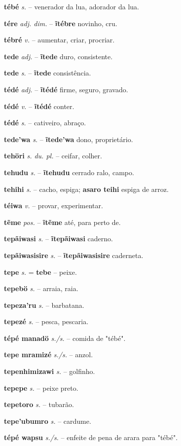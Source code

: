 \textbf{tébé} \textit{s.} -- venerador da lua, adorador da lua.

\textbf{tére} \textit{adj. dim.} -- \textbf{ĩtébre} novinho, cru.

\textbf{tébré} \textit{v.} -- aumentar, criar, procriar.

\textbf{tede} \textit{adj.} -- \textbf{ĩtede} duro, consistente.

\textbf{tede} \textit{s.} -- \textbf{ĩtede} consistência.

\textbf{tédé} \textit{adj.} -- \textbf{ĩtédé} firme, seguro, gravado.

\textbf{tédé} \textit{v.} -- \textbf{ĩtédé} conter.

\textbf{tédé} \textit{s.} -- cativeiro, abraço.

\textbf{tede'wa} \textit{s.} -- \textbf{ĩtede'wa} dono, proprietário.

\textbf{tehöri} \textit{s. du. pl.} -- ceifar, colher.

\textbf{tehudu} \textit{s.} -- \textbf{ĩtehudu} cerrado ralo, campo.

\textbf{tehihi} \textit{s.} -- cacho, espiga; \textbf{asaro teihi} espiga de arroz.

\textbf{téiwa} \textit{v.} -- provar, experimentar.

\textbf{tẽme} \textit{pos.} -- \textbf{ĩtẽme} até, para perto de.

\textbf{tepãiwasi} \textit{s.} -- \textbf{ĩtepãiwasi} caderno.

\textbf{tepãiwasisire} \textit{s.} -- \textbf{ĩtepãiwasisire} caderneta.

\textbf{tepe} \textit{s.} = \textbf{tebe} -- peixe.

\textbf{tepebö} \textit{s.} -- arraia, raia.

\textbf{tepeza'ru} \textit{s.} -- barbatana.

\textbf{tepezé} \textit{s.} -- pesca, pescaria.

\textbf{tépé manadö} \textit{s./s.} -- comida de "tébé".

\textbf{tepe mramizé} \textit{s./s.} -- anzol.

\textbf{tepenhimizawi} \textit{s.} -- golfinho.

\textbf{tepepe} \textit{s.} -- peixe preto.

\textbf{tepetoro} \textit{s.} -- tubarão.

\textbf{tepe'ubumro} \textit{s.} -- cardume.

\textbf{tépé wapsu} \textit{s./s.} -- enfeite de pena de arara para "tébé".


